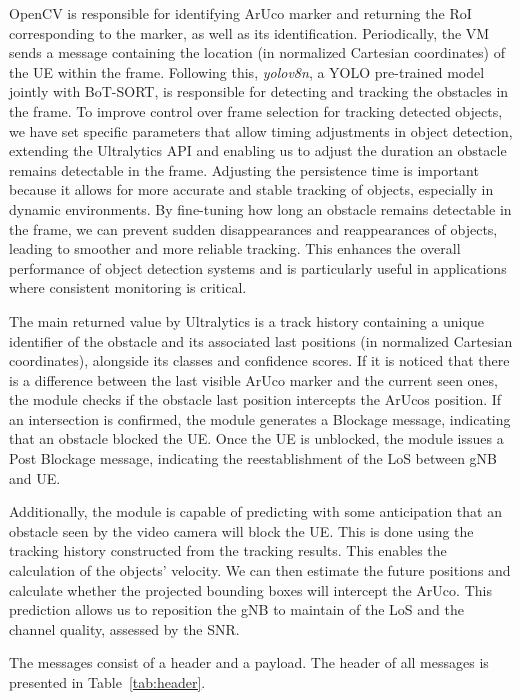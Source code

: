 OpenCV is responsible for identifying ArUco marker and returning the RoI corresponding to the marker, as well as its identification.
Periodically, the VM sends a message containing the location (in normalized Cartesian coordinates) of the UE within the frame\@.
Following this, \emph{yolov8n}, a YOLO pre-trained model jointly with BoT-SORT, is responsible for detecting and tracking the obstacles in the frame.
To improve control over frame selection for tracking detected objects, we have set specific parameters that allow timing adjustments in object detection, extending the Ultralytics API and enabling us to adjust the duration an obstacle remains detectable in the frame.
Adjusting the persistence time is important because it allows for more accurate and stable tracking of objects, especially in dynamic environments.
By fine-tuning how long an obstacle remains detectable in the frame, we can prevent sudden disappearances and reappearances of objects, leading to smoother and more reliable tracking.
This enhances the overall performance of object detection systems and is particularly useful in applications where consistent monitoring is critical.

The main returned value by Ultralytics is a track history containing a unique identifier of the obstacle and its associated last positions (in normalized Cartesian coordinates), alongside its classes and confidence scores.
If it is noticed that there is a difference between the last visible ArUco marker and the current seen ones, the module checks if the obstacle last position intercepts the ArUcos position.
If an intersection is confirmed, the module generates a Blockage message, indicating that an obstacle blocked the UE\@.
Once the UE is unblocked, the module issues a Post Blockage message, indicating the reestablishment of the LoS between gNB and UE.

Additionally, the module is capable of predicting with some anticipation that an obstacle seen by the video camera will block the UE\@.
This is done using the tracking history constructed from the tracking results.
This enables the calculation of the objects' velocity.
We can then estimate the future positions and calculate whether the projected bounding boxes will intercept the ArUco.
This prediction allows us to reposition the gNB to maintain of the LoS and the channel quality, assessed by the SNR\@.

The messages consist of a header and a payload.
The header of all messages is presented in Table~\ref{tab:header}.


